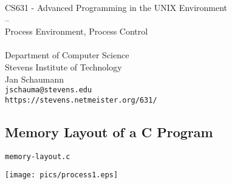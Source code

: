 \documentclass[xga]{xdvislides}
\begin{document}
\setfontphv

\lhead{\slidetitle}
\cfoot{\relax}
\rfoot{\Gray{\today}}

\newcommand{\smallish}{\fontsize{16}{16}\selectfont}

\vspace*{\fill}
\begin{center}
	\Hugesize
		CS631 - Advanced Programming in the UNIX Environment\\
		-- \\
		Process Environment, Process Control \\
	\hspace*{5mm}\blueline\\ [1em]
	\Normalsize
		Department of Computer Science\\
		Stevens Institute of Technology\\
		Jan Schaumann\\
		\verb+jschauma@stevens.edu+\\
		\verb+https://stevens.netmeister.org/631/+
\end{center}
\vspace*{\fill}


\subsection{Memory Layout of a C Program}
{\tt memory-layout.c}
\begin{center}
	\texttt{[image: pics/process1.eps]}
\end{center}
\end{document}
